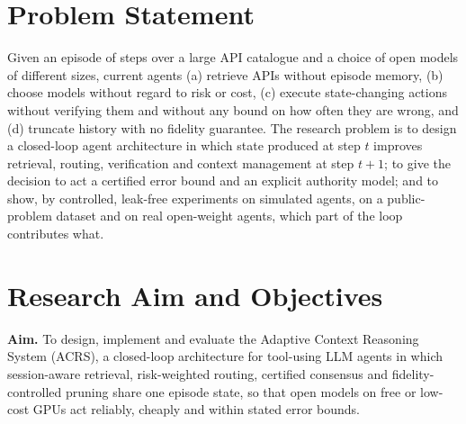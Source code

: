 \section{Problem Statement}
\label{sec:intro-problem}

Given an episode of steps over a large API catalogue and a choice of open models of different sizes,
current agents (a) retrieve APIs without episode memory, (b) choose models without regard to risk or
cost, (c) execute state-changing actions without verifying them and without any bound on how often they
are wrong, and (d) truncate history with no fidelity guarantee. The research problem is to design a
closed-loop agent architecture in which state produced at step $t$ improves retrieval, routing,
verification and context management at step $t+1$; to give the decision to act a certified error bound
and an explicit authority model; and to show, by controlled, leak-free experiments on simulated agents,
on a public-problem dataset and on real open-weight agents, which part of the loop contributes what.

\section{Research Aim and Objectives}
\label{sec:intro-objectives}

\textbf{Aim.} To design, implement and evaluate the Adaptive Context Reasoning System (ACRS), a
closed-loop architecture for tool-using LLM agents in which session-aware retrieval, risk-weighted
routing, certified consensus and fidelity-controlled pruning share one episode state, so that open
models on free or low-cost GPUs act reliably, cheaply and within stated error bounds.

